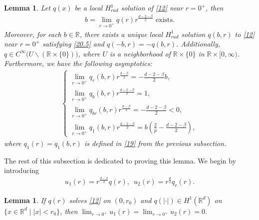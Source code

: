 \documentclass[12pt]{amsart}
\newcommand{\R}{\mathbb R}
\newtheorem{lemma}[theorem]{Lemma}
\begin{document}
\begin{lemma}\label{lm: q}
Let $q(x)$ be a local $H^1_{rad}$ solution of \eqref{12} near $r=0^+$, then 
\begin{align}\label{20.5}
b= \lim_{r\to 0^+} q(r) r^{\frac{d-2-\beta}2} \text{ exists}.
\end{align}
Moreover, for each $b\in \R$, there exists a unique local $H_{rad}^1$ solution $q(b, r)$ to \eqref{12} near $r=0^+$ satisfying \eqref{20.5} and $q(-b, r) = - q(b, r)$. Additionally, $q \in C^\infty \big( 
U\backslash (\R \times \{0\}) \big)$, where $U$ is a neighborhood of $\R \times \{0\}$ in  $\R \times [0, \infty)$. Furthermore, we have the following asymptotics: 
\begin{align}\label{64}
\begin{cases}
\lim_{r\to 0^+} q_r(b,r) r^{\frac{d-\beta}2}=-\tfrac{d-2-\beta}2 b,\\
\lim_{r\to 0^+} q_b(b,r) r^{\frac{d-2-\beta}2}=1,\\
\lim_{r\to 0^+} q_{br}(b,r) r^{\frac{d-\beta}2}=-\tfrac{d-2-\beta}2<0, \\
\lim_{r\to 0^+} q_1(b,r)r^{\frac{d-2-\beta}2}=b(\tfrac 2p-\tfrac{d-2-\beta}2),
\end{cases}
\end{align}
where $q_1(r)=q_1(b,r)$ is defined in \eqref{19} from the previous subsection. 
\end{lemma}

The rest of this subsection is dedicated to proving this lemma. 
We begin by introducing 
\begin{align}\label{8}
u_1(r)=r^{\frac{d-2} 2} q(r), \ \; u_2(r)=r^{\frac d2}q_r(r). 
\end{align}

\begin{lemma} \label{L:H1-0a}
If $q(r)$ solves \eqref{12} on $(0, r_0)$ and $q(|\cdot|) \in H^1(\R^d)$ on $ \{x \in \R^d \mid |x| < r_0\}$, then $\lim_{r\to 0^+} u_1(r) =\lim_{r\to 0^+} u_2(r)  =0$.   
\end{lemma} 
\end{document}
